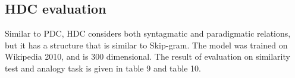 \documentclass[a4paper, 11pt]{article}
\begin{document}
\subsection{HDC evaluation}
Similar to PDC, HDC considers both syntagmatic and paradigmatic relations, but it has a structure that is similar to Skip-gram. The model was trained on Wikipedia 2010, and is 300 dimensional. The result of evaluation on similarity test and analogy task is given in table 9 and table 10.
\begin{table}[ht!]
\centering
{}
\caption{Similarity result of HDC}
\label{tab:my-table}
\end{table}
\begin{table}[ht!]
\centering
{}
\caption{Analogy tasks on HDC }
\label{tab:my-table}
\end{table}
\end{document}
